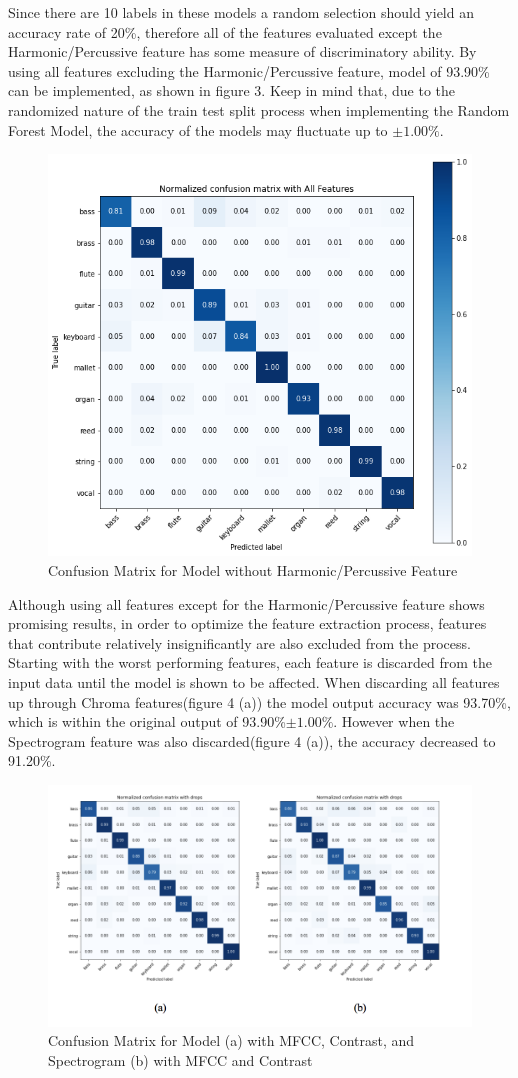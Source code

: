 \documentclass{article}
\begin{document}
Since there are 10 labels in these models a random selection should yield an accuracy rate of 20\%, therefore all of the features evaluated except the  Harmonic/Percussive feature has some measure of discriminatory ability. By using all features excluding the Harmonic/Percussive feature, model of 93.90\% can be implemented, as shown in figure 3. Keep in mind that, due to the randomized nature of the train test split process when implementing the Random Forest Model, the accuracy of the models may fluctuate up to $\pm 1.00\%$.

\begin{figure}[htb]
  \centering
  \includegraphics[width=.5\linewidth]{cm_all_feat}
  \caption{Confusion Matrix for Model without Harmonic/Percussive Feature}
\end{figure}

Although using all features except for the Harmonic/Percussive feature shows promising results, in order to optimize the feature extraction process, features that contribute relatively insignificantly are also excluded from the process. Starting with the worst performing features, each feature is discarded from the input data until the model is shown to be affected. When discarding all features up through Chroma features(figure 4 (a)) the model output accuracy was 93.70\%, which is within the original output of 93.90\%$\pm 1.00\%$. However when the Spectrogram feature was also discarded(figure 4 (a)), the accuracy decreased to 91.20\%. 

\begin{figure}[htb]
  \centering
  \includegraphics[width=1\linewidth]{cm_drop}
  \caption{Confusion Matrix for Model (a) with MFCC, Contrast, and Spectrogram (b) with MFCC and Contrast}
\end{figure}
\end{document}
